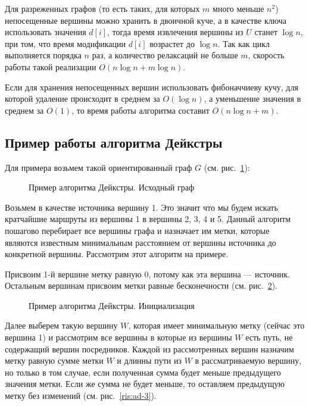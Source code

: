 Для разреженных графов (то есть таких, для которых $m$ много меньше $n^2$) непосещенные вершины можно хранить в двоичной куче, а в качестве ключа использовать значения $d[i]$, тогда время извлечения вершины из $U$ станет $\log n$, при том, что время модификации $d[i]$ возрастет до $\log n$. 
Так как цикл выполняется порядка $n$ раз, а количество релаксаций не больше $m$, скорость работы такой реализации $O(n\log n + m\log n)$.

Если для хранения непосещенных вершин использовать фибоначчиеву кучу, для которой удаление происходит в среднем за $O(\log n)$, а уменьшение значения в среднем за $O(1)$, то время работы алгоритма составит $O(n\log n + m)$.

\subsection{Пример работы алгоритма Дейкстры}

Для примера возьмем такой ориентированный граф $G$ (см. рис.~\ref{ris:ad-1}):
\begin{figure}[ht]
\caption{Пример алгоритма Дейкстры. Исходный граф}
\label{ris:ad-1}
\end{figure}

Возьмем в качестве источника вершину 1. 
Это значит что мы будем искать кратчайшие маршруты из вершины 1 в вершины 2, 3, 4 и 5.
Данный алгоритм пошагово перебирает все вершины графа и назначает им метки, которые являются известным минимальным расстоянием от вершины источника до конкретной вершины. 
Рассмотрим этот алгоритм на примере. 

Присвоим 1-й вершине метку равную 0, потому как эта вершина --- источник. 
Остальным вершинам присвоим метки равные бесконечности (см. рис.~\ref{ris:ad-2}).

\begin{figure}[ht]
\caption{Пример алгоритма Дейкстры. Инициализация}
\label{ris:ad-2}
\end{figure}

Далее выберем такую вершину $W$, которая имеет минимальную метку (сейчас это вершина 1) и рассмотрим все вершины в которые из вершины $W$ есть путь, не содержащий вершин посредников. 
Каждой из рассмотренных вершин назначим метку равную сумме метки $W$ и длинны пути из $W$ в рассматриваемую вершину, но только в том случае, если полученная сумма будет меньше предыдущего значения метки. 
Если же сумма не будет меньше, то оставляем предыдущую метку без изменений (см. рис.~\ref{ris:ad-3}).

